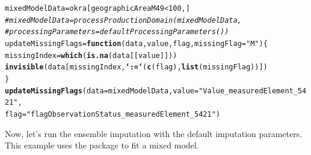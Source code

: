\documentclass[nojss]{jss}\usepackage[]{graphicx}\usepackage[]{color}
\makeatletter
\newcommand{\hlnum}[1]{\textcolor[rgb]{0.686,0.059,0.569}{#1}}%
\newcommand{\hlstr}[1]{\textcolor[rgb]{0.192,0.494,0.8}{#1}}%
\newcommand{\hlcom}[1]{\textcolor[rgb]{0.678,0.584,0.686}{\textit{#1}}}%
\newcommand{\hlopt}[1]{\textcolor[rgb]{0,0,0}{#1}}%
\newcommand{\hlstd}[1]{\textcolor[rgb]{0.345,0.345,0.345}{#1}}%
\newcommand{\hlkwa}[1]{\textcolor[rgb]{0.161,0.373,0.58}{\textbf{#1}}}%
\newcommand{\hlkwb}[1]{\textcolor[rgb]{0.69,0.353,0.396}{#1}}%
\newcommand{\hlkwc}[1]{\textcolor[rgb]{0.333,0.667,0.333}{#1}}%
\newcommand{\hlkwd}[1]{\textcolor[rgb]{0.737,0.353,0.396}{\textbf{#1}}}%
\newenvironment{kframe}{%
 \def\at@end@of@kframe{}%
 \ifinner\ifhmode%
  \def\at@end@of@kframe{\end{minipage}}%
  \begin{minipage}{\columnwidth}%
 \fi\fi%
 \def\FrameCommand##1{\hskip\@totalleftmargin \hskip-\fboxsep
 \colorbox{shadecolor}{##1}\hskip-\fboxsep
     \hskip-\linewidth \hskip-\@totalleftmargin \hskip\columnwidth}%
 \MakeFramed {\advance\hsize-\width
   \@totalleftmargin\z@ \linewidth\hsize
   \@setminipage}}%
 {\par\unskip\endMakeFramed%
 \at@end@of@kframe}
\newenvironment{knitrout}{}{} %
\makeatother
\begin{document}
\begin{knitrout}
\color{fgcolor}\begin{kframe}
\begin{alltt}
\hlstd{mixedModelData} \hlkwb{=} \hlstd{okra[geographicAreaM49} \hlopt{<} \hlnum{100}\hlstd{, ]}
\hlcom{# mixedModelData = processProductionDomain(mixedModelData,}
\hlcom{#         processingParameters = defaultProcessingParameters())}
\hlstd{updateMissingFlags} \hlkwb{=} \hlkwa{function}\hlstd{(}\hlkwc{data}\hlstd{,} \hlkwc{value}\hlstd{,} \hlkwc{flag}\hlstd{,} \hlkwc{missingFlag} \hlstd{=} \hlstr{"M"}\hlstd{)\{}
    \hlstd{missingIndex} \hlkwb{=} \hlkwd{which}\hlstd{(}\hlkwd{is.na}\hlstd{(data[[value]]))}
    \hlkwd{invisible}\hlstd{(data[missingIndex,} \hlkwd{`:=`}\hlstd{(}\hlkwd{c}\hlstd{(flag),} \hlkwd{list}\hlstd{(missingFlag))])}
\hlstd{\}}
\hlkwd{updateMissingFlags}\hlstd{(}\hlkwc{data} \hlstd{= mixedModelData,} \hlkwc{value} \hlstd{=} \hlstr{"Value_measuredElement_5421"}\hlstd{,}
         \hlkwc{flag} \hlstd{=} \hlstr{"flagObservationStatus_measuredElement_5421"}\hlstd{)}
\end{alltt}
\end{kframe}
\end{knitrout}

Now, let's run the ensemble imputation with the default imputation parameters.
This example uses the  package to fit a mixed model.
\end{document}
